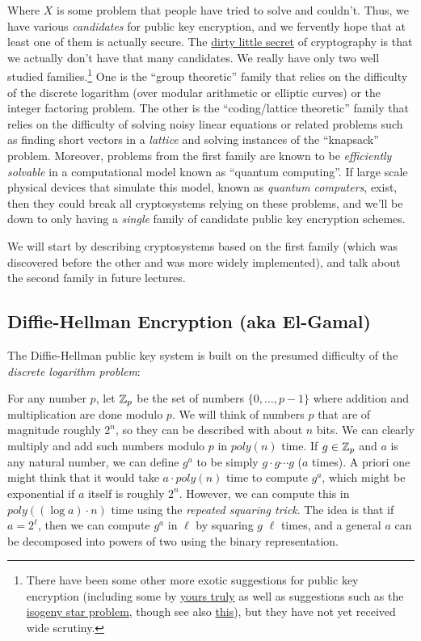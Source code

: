 Where \(X\) is some problem that people have tried to solve and
couldn't. Thus, we have various \emph{candidates} for public key
encryption, and we fervently hope that at least one of them is actually
secure. The \href{https://eprint.iacr.org/2017/365.pdf}{dirty little
secret} of cryptography is that we actually don't have that many
candidates. We really have only two well studied families.\footnote{There
  have been some other more exotic suggestions for public key encryption
  (including some by
  \href{http://www.eng.tau.ac.il/~bennyap/pubs/ncpkcFull1.pdf}{yours
  truly} as well as suggestions such as the
  \href{http://eprint.iacr.org/2006/291}{isogeny star problem}, though
  see also \href{http://arxiv.org/pdf/1012.4019.pdf}{this}), but they
  have not yet received wide scrutiny.} One is the ``group theoretic''
family that relies on the difficulty of the discrete logarithm (over
modular arithmetic or elliptic curves) or the integer factoring problem.
The other is the ``coding/lattice theoretic'' family that relies on the
difficulty of solving noisy linear equations or related problems such as
finding short vectors in a \emph{lattice} and solving instances of the
``knapsack'' problem. Moreover, problems from the first family are known
to be \emph{efficiently solvable} in a computational model known as
``quantum computing''. If large scale physical devices that simulate
this model, known as \emph{quantum computers}, exist, then they could
break all cryptosystems relying on these problems, and we'll be down to
only having a \emph{single} family of candidate public key encryption
schemes.

We will start by describing cryptosystems based on the first family
(which was discovered before the other and was more widely implemented),
and talk about the second family in future lectures.

\subsection{Diffie-Hellman Encryption (aka
El-Gamal)}\label{10-Diffie-Hellman-Encrypt}

The Diffie-Hellman public key system is built on the presumed difficulty
of the \emph{discrete logarithm problem}:

For any number \(p\), let \({\mathbb{Z}}_p\) be the set of numbers
\(\{0,\ldots,p-1\}\) where addition and multiplication are done modulo
\(p\). We will think of numbers \(p\) that are of magnitude roughly
\(2^n\), so they can be described with about \(n\) bits. We can clearly
multiply and add such numbers modulo \(p\) in \(poly(n)\) time. If
\(g\in {\mathbb{Z}}_p\) and \(a\) is any natural number, we can define \(g^a\) to
be simply \(g\cdot g \cdots g\) (\(a\) times). A priori one might think
that it would take \(a\cdot poly(n)\) time to compute \(g^a\), which
might be exponential if \(a\) itself is roughly \(2^n\). However, we can
compute this in \(poly((\log a) \cdot n)\) time using the \emph{repeated
squaring trick}. The idea is that if \(a=2^{\ell}\), then we can compute
\(g^a\) in \(\ell\) by squaring \(g\) \(\ell\) times, and a general
\(a\) can be decomposed into powers of two using the binary
representation.

